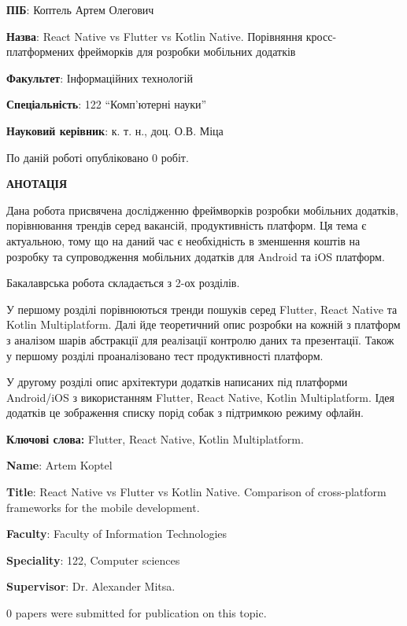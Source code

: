 
\textbf{ПІБ}: Коптель Артем Олегович

\textbf{Назва}: React Native vs Flutter vs Kotlin Native. Порівняння кросс-платформених фрейморків для розробки мобільних додатків

\textbf{Факультет}: Інформаційних технологій

\textbf{Спеціальність}: 122 ``Комп'ютерні науки''

\textbf{Науковий керівник}: к. т. н., доц. О.В. Міца

По даній роботі опубліковано $0$ робіт.

\begin{center}
\textbf{АНОТАЦІЯ}
\end{center}

Дана робота присвячена дослідженню фреймворків розробки мобільних додатків,
порівнювання трендів серед вакансій, продуктивність платформ.
Ця тема є актуальною, тому що на даний час є необхідність в зменшення коштів на розробку та супроводження
мобільних додатків для Android та iOS платформ.

Бакалаврська робота складається з 2-ох розділів.

У першому розділі порівнюються тренди пошуків серед Flutter, React Native та Kotlin Multiplatform.
Далі йде теоретичний опис розробки на кожній з платформ з аналізом шарів абстракції для реалізації
контролю даних та презентації. Також у першому розділі проаналізовано тест продуктивності платформ.

У другому розділі опис архітектури додатків написаних під платформи Android/iOS з використанням
Flutter, React Native, Kotlin Multiplatform. Ідея додатків це зображення списку порід собак з
підтримкою режиму офлайн.

{\bf Ключові слова:} Flutter, React Native, Kotlin Multiplatform.

\newpage

\textbf{Name}: Artem Koptel

\textbf{Title}: React Native vs Flutter vs Kotlin Native. Comparison of cross-platform frameworks for the mobile development.

\textbf{Faculty}: Faculty of Information Technologies

\textbf{Speciality}: 122, Computer sciences

\textbf{Supervisor}: Dr. Alexander Mitsa. 

$0$ papers were submitted for publication on this topic.

